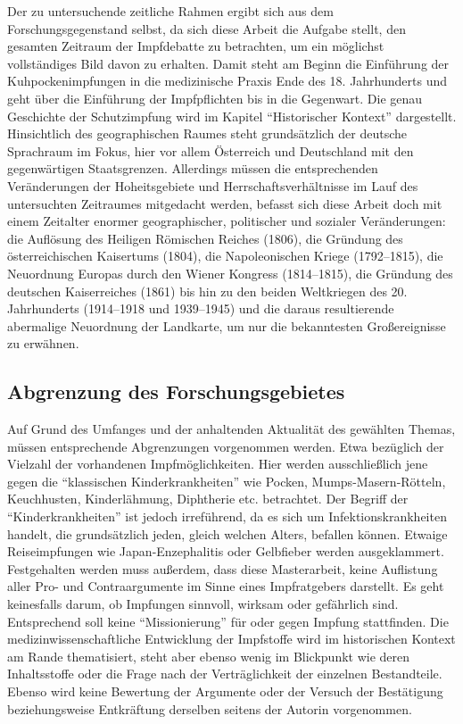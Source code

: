 \documentclass[
    a4paper,
    12pt,
    hyphens,
    chapterprefix=true,
    headheight=33pt,
    footheight=29pt,
    headings=optiontohead, %
]{scrartcl}
\begin{document}
Der zu untersuchende zeitliche Rahmen ergibt sich aus dem Forschungsgegenstand selbst, da sich diese Arbeit die Aufgabe stellt, den gesamten Zeitraum der Impfdebatte zu betrachten, um ein möglichst vollständiges Bild davon zu erhalten. Damit steht am Beginn die Einführung der Kuhpockenimpfungen in die medizinische Praxis Ende des 18. Jahrhunderts und geht über die Einführung der Impfpflichten bis in die Gegenwart. Die genau Geschichte der Schutzimpfung wird im Kapitel "`Historischer Kontext"' dargestellt.\\
Hinsichtlich des geographischen Raumes steht grundsätzlich der deutsche Sprachraum im Fokus, hier vor allem Österreich und Deutschland mit den gegenwärtigen Staatsgrenzen. Allerdings müssen die entsprechenden Veränderungen der Hoheitsgebiete und Herrschaftsverhältnisse im Lauf des untersuchten Zeitraumes mitgedacht werden, befasst sich diese Arbeit doch mit einem Zeitalter enormer geographischer, politischer und sozialer Veränderungen: die Auflösung des Heiligen Römischen Reiches (1806), die Gründung des österreichischen Kaisertums (1804), die Napoleonischen Kriege (1792--1815), die Neuordnung Europas durch den Wiener Kongress (1814--1815), die Gründung des deutschen Kaiserreiches (1861) bis hin zu den beiden Weltkriegen des 20. Jahrhunderts (1914--1918 und 1939--1945) und die daraus resultierende abermalige Neuordnung der Landkarte, um nur die bekanntesten Großereignisse zu erwähnen.

\subsection{Abgrenzung des Forschungsgebietes}
Auf Grund des Umfanges und der anhaltenden Aktualität des gewählten Themas, müssen entsprechende Abgrenzungen vorgenommen werden. Etwa bezüglich der Vielzahl der vorhandenen Impfmöglichkeiten. Hier  werden ausschließlich jene gegen die "`klassischen Kinderkrankheiten"' wie Pocken, Mumps-Masern-Rötteln, Keuchhusten, Kinderlähmung, Diphtherie etc. betrachtet. Der Begriff der "`Kinderkrankheiten"' ist jedoch irreführend, da es sich um Infektionskrankheiten handelt, die grundsätzlich jeden, gleich welchen Alters, befallen können. Etwaige Reiseimpfungen wie Japan-Enzephalitis oder Gelbfieber werden ausgeklammert.\\ 
Festgehalten werden muss außerdem, dass diese Masterarbeit, keine Auflistung aller Pro- und Contraargumente im Sinne eines Impfratgebers darstellt. Es geht keinesfalls darum, ob Impfungen sinnvoll, wirksam oder gefährlich sind. Entsprechend soll keine "`Missionierung"' für oder gegen Impfung stattfinden. Die medizinwissenschaftliche Entwicklung der Impfstoffe wird im historischen Kontext am Rande thematisiert, steht aber ebenso wenig im Blickpunkt wie deren Inhaltsstoffe oder die Frage nach der Verträglichkeit der einzelnen Bestandteile. Ebenso wird keine Bewertung der Argumente oder der Versuch der Bestätigung beziehungsweise Entkräftung derselben seitens der Autorin vorgenommen. 
\end{document}

